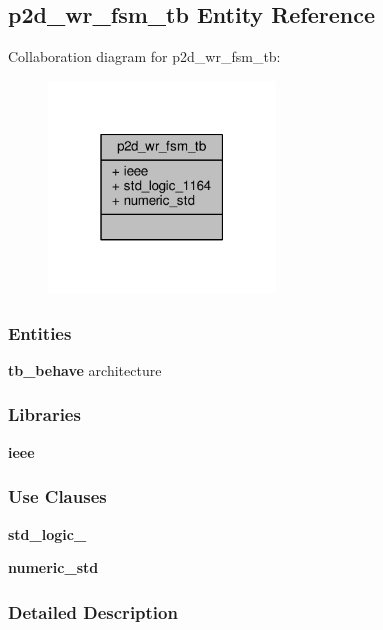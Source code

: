 \subsection{p2d\+\_\+wr\+\_\+fsm\+\_\+tb Entity Reference}
\label{classp2d__wr__fsm__tb}


Collaboration diagram for p2d\+\_\+wr\+\_\+fsm\+\_\+tb\+:\nopagebreak
\begin{figure}[H]
\begin{center}
\leavevmode
\includegraphics[width=171pt]{d3/d6f/classp2d__wr__fsm__tb__coll__graph}
\end{center}
\end{figure}
\subsubsection*{Entities}
\begin{DoxyCompactItemize}
\item 
{\bf tb\+\_\+behave} architecture
\end{DoxyCompactItemize}
\subsubsection*{Libraries}
 \begin{DoxyCompactItemize}
\item 
{\bf ieee} 
\end{DoxyCompactItemize}
\subsubsection*{Use Clauses}
 \begin{DoxyCompactItemize}
\item 
{\bf std\+\_\+logic\+\_}   
\item 
{\bf numeric\+\_\+std}   
\end{DoxyCompactItemize}


\subsubsection{Detailed Description}



